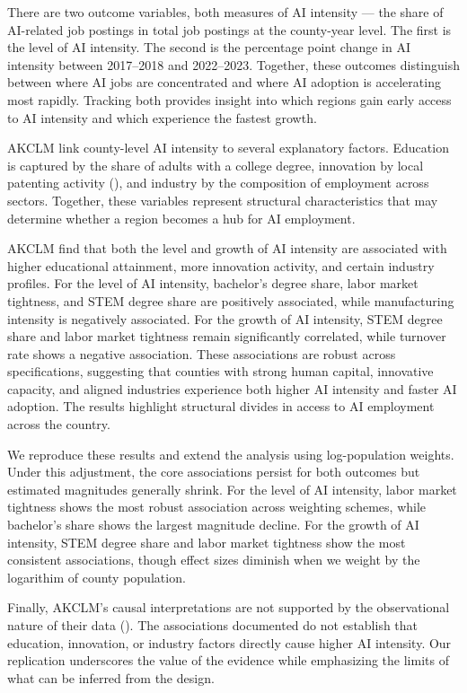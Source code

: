 \documentclass[
]{article}
\begin{document}
There are two outcome variables, both measures of AI intensity --- the
share of AI-related job postings in total job postings at the
county-year level. The first is the level of AI intensity. The second is
the percentage point change in AI intensity between 2017--2018 and
2022--2023. Together, these outcomes distinguish between where AI jobs
are concentrated and where AI adoption is accelerating most rapidly.
Tracking both provides insight into which regions gain early access to
AI intensity and which experience the fastest growth.

AKCLM link county-level AI intensity to several explanatory factors.
Education is captured by the share of adults with a college degree,
innovation by local patenting activity (), and industry by the composition of
employment across sectors. Together, these variables represent
structural characteristics that may determine whether a region becomes a
hub for AI employment.

AKCLM find that both the level and growth of AI intensity are associated
with higher educational attainment, more innovation activity, and
certain industry profiles. For the level of AI intensity, bachelor's
degree share, labor market tightness, and STEM degree share are
positively associated, while manufacturing intensity is negatively
associated. For the growth of AI intensity, STEM degree share and labor
market tightness remain significantly correlated, while turnover rate
shows a negative association. These associations are robust across
specifications, suggesting that counties with strong human capital,
innovative capacity, and aligned industries experience both higher AI
intensity and faster AI adoption. The results highlight structural
divides in access to AI employment across the country.

We reproduce these results and extend the analysis using log-population
weights. Under this adjustment, the core associations persist for both
outcomes but estimated magnitudes generally shrink. For the level of AI
intensity, labor market tightness shows the most robust association
across weighting schemes, while bachelor's share shows the largest
magnitude decline. For the growth of AI intensity, STEM degree share and
labor market tightness show the most consistent associations, though
effect sizes diminish when we weight by the logarithim of county
population.

Finally, AKCLM's causal interpretations are not supported by the
observational nature of their data (). The associations documented do not establish that education,
innovation, or industry factors directly cause higher AI intensity. Our
replication underscores the value of the evidence while emphasizing the
limits of what can be inferred from the design.
\end{document}
